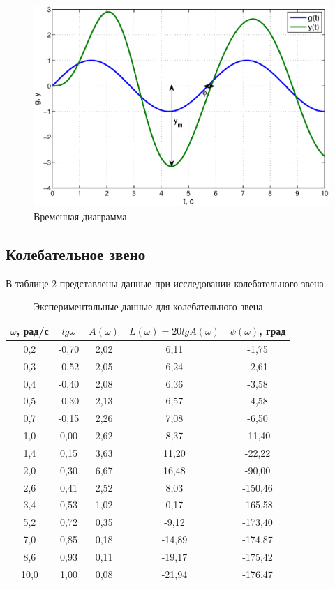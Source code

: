 \documentclass[12pt,a4paper]{article}
\begin{document}
\begin{figure}[H]
	\centering
	\includegraphics[width=0.8\linewidth]{timedia.eps}
	\caption{Временная диаграмма}
\end{figure}

\newpage
\begin{center}
\section{Колебательное звено}
\end{center}

В таблице 2 представлены данные при исследовании колебательного звена.
\begin{table}[h!]
	\renewcommand{\arraystretch}{1.8} %
	\centering
	\begin{threeparttable}
	\caption{Экспериментальные данные для колебательного звена}
	\begin{tabular}{|c|c|c|c|c|}
		\hline $\omega$, рад/с & $lg\omega$ & $A(\omega)$ & $L(\omega)=20lgA(\omega)$ & $\psi(\omega)$, град\\
		\hline 0,2 & -0,70 & 2,02 & 6,11 & -1,75\\
		\hline 0,3 & -0,52 & 2,05 & 6,24 & -2,61\\
		\hline 0,4 & -0,40 & 2,08 & 6,36 & -3,58\\
		\hline 0,5 & -0,30 & 2,13 & 6,57 & -4,58\\
		\hline 0,7 & -0,15 & 2,26 & 7,08 & -6,50\\
		\hline 1,0 & 0,00 & 2,62 & 8,37 & -11,40\\
		\hline 1,4 & 0,15 & 3,63 & 11,20 & -22,22\\
		\hline 2,0 & 0,30 & 6,67 & 16,48 & -90,00\\
		\hline 2,6 & 0,41 & 2,52 & 8,03 & -150,46\\
		\hline 3,4 & 0,53 & 1,02 & 0,17 & -165,58\\
		\hline 5,2 & 0,72 & 0,35 & -9,12 & -173,40\\
		\hline 7,0 & 0,85 & 0,18 & -14,89 & -174,87\\
		\hline 8,6 & 0,93 & 0,11 & -19,17 & -175,42\\
		\hline 10,0 & 1,00 & 0,08 & -21,94 & -176,47\\
		\hline
	\end{tabular}
	\end{threeparttable}
\end{table}
\end{document}
